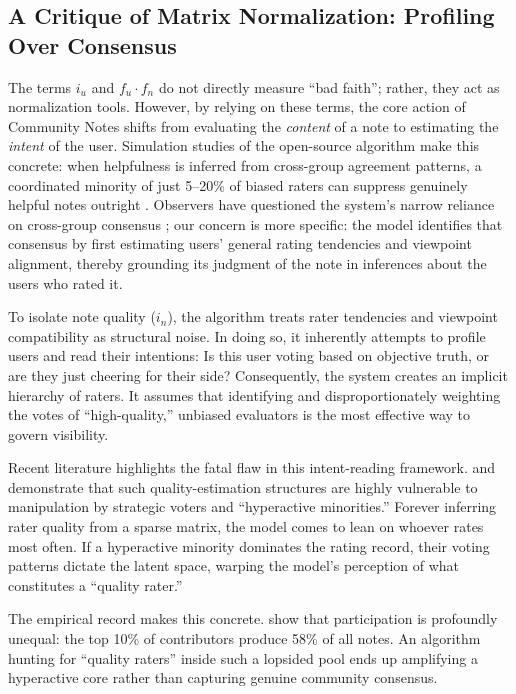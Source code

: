 \documentclass[10pt,twocolumn]{article}
\begin{document}
\subsection*{A Critique of Matrix Normalization: Profiling Over Consensus}
The terms $i_u$ and $f_u \cdot f_n$ do not directly measure ``bad faith''; rather, they act as normalization tools. However, by relying on these terms, the core action of Community Notes shifts from evaluating the \textit{content} of a note to estimating the \textit{intent} of the user. Simulation studies of the open-source algorithm make this concrete: when helpfulness is inferred from cross-group agreement patterns, a coordinated minority of just 5--20\% of biased raters can suppress genuinely helpful notes outright \citep{truong2025vulnerable}. Observers have questioned the system's narrow reliance on cross-group consensus \citep{jude2025narrow}; our concern is more specific: the model identifies that consensus by first estimating users' general rating tendencies and viewpoint alignment, thereby grounding its judgment of the note in inferences about the users who rated it.

To isolate note quality ($i_n$), the algorithm treats rater tendencies and viewpoint compatibility as structural noise. In doing so, it inherently attempts to profile users and read their intentions: Is this user voting based on objective truth, or are they just cheering for their side? Consequently, the system creates an implicit hierarchy of raters. It assumes that identifying and disproportionately weighting the votes of ``high-quality,'' unbiased evaluators is the most effective way to govern visibility.

Recent literature highlights the fatal flaw in this intent-reading framework. \citet{goyal2026qsmf} and \citet{nudo2026hyperactive} demonstrate that such quality-estimation structures are highly vulnerable to manipulation by strategic voters and ``hyperactive minorities.'' Forever inferring rater quality from a sparse matrix, the model comes to lean on whoever rates most often. If a hyperactive minority dominates the rating record, their voting patterns dictate the latent space, warping the model's perception of what constitutes a ``quality rater.''

The empirical record makes this concrete. \citet{razuvayevskaya2025timeliness} show that participation is profoundly unequal: the top 10\% of contributors produce 58\% of all notes. An algorithm hunting for ``quality raters'' inside such a lopsided pool ends up amplifying a hyperactive core rather than capturing genuine community consensus.
\end{document}
